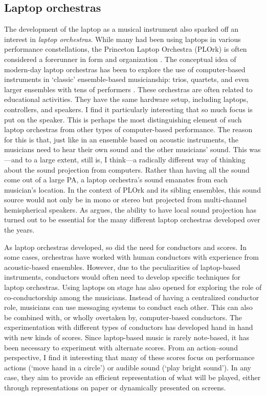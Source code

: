 \subsection{Laptop orchestras}

The development of the laptop as a musical instrument also sparked off an interest in \emph{laptop orchestras}. While many had been using laptops in various performance constellations, the Princeton Laptop Orchestra (PLOrk) is often considered a forerunner in form and organization \citep{trueman_why_2007}.
The conceptual idea of modern-day laptop orchestras has been to explore the use of computer-based instruments in `classic' ensemble-based musicianship: trios, quartets, and even larger ensembles with tens of performers \citep{knotts_politics_2014}. These orchestras are often related to educational activities. They have the same hardware setup, including laptops, controllers, and speakers. I find it particularly interesting that so much focus is put on the speaker. This is perhaps the most distinguishing element of such laptop orchestras from other types of computer-based performance. The reason for this is that, just like in an ensemble based on acoustic instruments, the musicians need to hear their own sound and the other musicians' sound. This was---and to a large extent, still is, I think---a radically different way of thinking about the sound projection from computers. Rather than having all the sound come out of a large PA, a laptop orchestra's sound emanates from each musician's location. In the context of PLOrk and its sibling ensembles, this sound source would not only be in mono or stereo but projected from multi-channel hemispherical speakers. As \citet{jensenius_author_2017} argues, the ability to have local sound projection has turned out to be essential for the many different laptop orchestras developed over the years.

As laptop orchestras developed, so did the need for conductors and scores. In some cases, orchestras have worked with human conductors with experience from acoustic-based ensembles. However, due to the peculiarities of laptop-based instruments, conductors would often need to develop specific techniques for laptop orchestras. Using laptops on stage has also opened for exploring the role of co-conductorship among the musicians. Instead of having a centralized conductor role, musicians can use messaging systems to conduct each other. This can also be combined with, or wholly overtaken by, computer-based conductors. The experimentation with different types of conductors has developed hand in hand with new kinds of scores. Since laptop-based music is rarely note-based, it has been necessary to experiment with alternate scores. From an action--sound perspective, I find it interesting that many of these scores focus on performance actions (`move hand in a circle') or audible sound (`play bright sound'). In any case, they aim to provide an efficient representation of what will be played, either through representations on paper or dynamically presented on screens.

